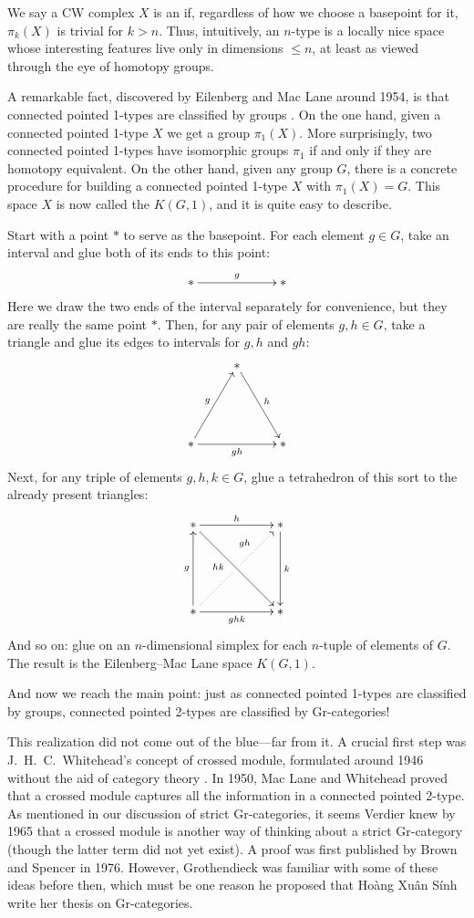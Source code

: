 \documentclass[reqno]{amsart}
\newcommand{\define}[1]{\textbf{\boldmath{#1}}}
\theoremstyle{definition}
\begin{document}
We say a CW complex $X$ is an \define{$n$-type} if, regardless of how we choose a basepoint for it, $\pi_k(X)$ is trivial for $k > n$.  Thus, intuitively, an $n$-type is a locally nice space whose interesting features live only in dimensions $\le n$, at least as viewed through the eye of homotopy groups.  

A remarkable fact, discovered by Eilenberg and Mac Lane around 1954, is that connected pointed 1-types are classified by groups \cite{EM54,EM55}.   On the one hand, given a connected pointed 1-type $X$ we get a group $\pi_1(X)$.   More surprisingly, two connected pointed 1-types have isomorphic groups $\pi_1$ if and only if they are homotopy equivalent.   On the other hand, given any group $G$, there is a concrete procedure for building a connected pointed 1-type $X$ with $\pi_1(X) = G$.   This space $X$ is now called the \define{Eilenberg--Mac Lane space} $K(G,1)$, and it is quite easy to describe.

Start with a point $\ast$ to serve as the basepoint.  For each element $g \in G$, take an interval and glue both of its ends to this point:
\[
\xy 0;/r3pc/:
   (0,0)*+{\ast}="x";
    (2,0)*+{\ast}="z";
 {\ar^{g} "x";"z"};
\endxy
\]
Here we draw the two ends of the interval separately for convenience, but they are really the same point $\ast$. Then, for any pair of elements $g,h \in G$, take a triangle and glue its edges to intervals for $g, h$ and $gh$:
\[
\xy 0;/r3pc/:
   (0,0)*+{\ast}="x";
    (1,1.7)*+{\ast}="y";
    (2,0)*+{\ast}="z";
 {\ar^{g} "x";"y"};
 {\ar^{h} "y";"z"};
 {\ar_{gh} "x";"z"};
\endxy
\]
Next, for any triple of elements $g,h,k \in G$, glue a tetrahedron of this sort to the already present triangles:
\[
{\xy 
(12,-12)*+{\ast}="1"; 
(12,12)*+{\ast}="2"; 
(-12,12)*+{\ast}="3"; 
(-12,-12)*+{\ast}="4"; 
(0,0)*+{}="0"; 
{\ar^-{k} "2";"1"}; 
{\ar^-{h} "3";"2"}; 
{\ar^-{g} "4";"3"};
{\ar_-{ghk} "4";"1"};
{\ar@{.>}^(0.4){\phantom{ab}gh} "0";"2"};
{\ar@{.} "4";"0"};
{\ar_(0.4){hk} "3";"1"};
\endxy}
\]
And so on: glue on an $n$-dimensional simplex for each $n$-tuple
of elements of $G$.   The result is the Eilenberg--Mac Lane space
$K(G,1)$.

And now we reach the main point: just as connected pointed 1-types are classified by groups, connected pointed 2-types are classified by Gr-categories!  

This realization did not come out of the blue---far from it.  A crucial first step was J.\ H.\ C.\ Whitehead's concept of crossed module, formulated around 1946 without the aid of category theory \cite{W46,W49}.  In 1950, Mac Lane and Whitehead \cite{MW} proved that a crossed module captures all the information in a connected pointed 2-type.   As mentioned in our discussion of strict Gr-categories, it seems Verdier knew by 1965 that a crossed module is another way of thinking about a strict Gr-category (though the latter term did not yet exist).  A proof was first published by Brown and Spencer \cite{BS76} in 1976.  However, Grothendieck was familiar with some of these ideas before then, which must be one reason he proposed that Ho\`ang Xu\^an S\'inh write her thesis on Gr-categories. 
\end{document}
